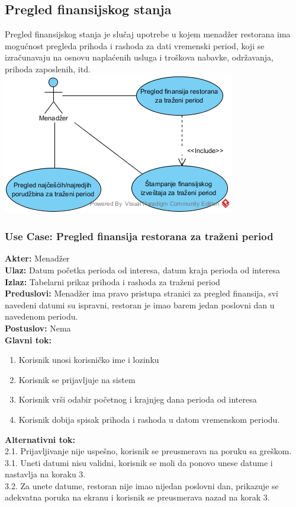\documentclass{article}
\begin{document}
\subsection{Pregled finansijskog stanja}
Pregled finansijskog stanja je slučaj upotrebe u kojem menadžer restorana ima mogućnost pregleda prihoda i rashoda za dati vremenski period, koji se izračunavaju na osnovu naplaćenih usluga i troškova nabavke, održavanja, prihoda zaposlenih, itd.
\\
\includegraphics[width=\linewidth]{SU_3_pregled_finansija.png}

\subsubsection{\textbf{Use Case}: Pregled finansija restorana za traženi period}
\textbf{Akter:} Menadžer\\
\textbf{Ulaz:} Datum početka perioda od interesa, datum kraja perioda od interesa\\
\textbf{Izlaz:} Tabelarni prikaz prihoda i rashoda za traženi period\\
\textbf{Preduslovi:} Menadžer ima pravo pristupa stranici za pregled finansija, svi navedeni datumi su ispravni, restoran je imao barem jedan poslovni dan u navedenom periodu.\\
\textbf{Postuslov:} Nema\\
\textbf{Glavni tok:}
\begin{enumerate}
\item Korisnik unosi korisničko ime i lozinku
\item Korisnik se prijavljuje na sistem
\item Korisnik vrši odabir početnog i krajnjeg dana perioda od interesa
\item Korisnik dobija spisak prihoda i rashoda u datom vremenskom periodu.
\end{enumerate}
\textbf{Alternativni tok:} \\
        2.1. Prijavljivanje nije uspešno, korisnik se preusmerava na poruku sa greškom.\\
        3.1. Uneti datumi nisu validni, korisnik se moli da ponovo unese datume i nastavlja na koraku 3.\\
        3.2. Za unete datume, restoran nije imao nijedan poslovni dan, prikazuje se adekvatna poruka na ekranu i korisnik se preusmerava nazad na korak 3.\\
		
\end{document}
